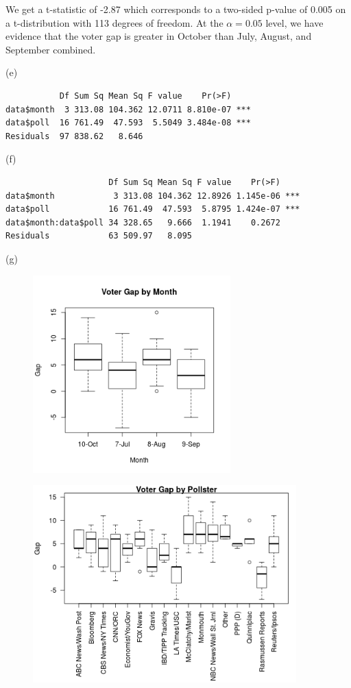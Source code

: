\documentclass[11pt]{article}
\begin{document}
We get a t-statistic of -2.87 which corresponds to a two-sided p-value of 0.005 on a t-distribution with 113 degrees of freedom.  At the $\alpha = 0.05$ level, we have evidence that the voter gap is greater in October than July, August, and September combined.

\vspace{0.1in}

\noindent (e)

\begin{verbatim}
           Df Sum Sq Mean Sq F value    Pr(>F)
data$month  3 313.08 104.362 12.0711 8.810e-07 ***
data$poll  16 761.49  47.593  5.5049 3.484e-08 ***
Residuals  97 838.62   8.646
\end{verbatim}

\vspace{0.1in}

\noindent (f)

\begin{verbatim}
                     Df Sum Sq Mean Sq F value    Pr(>F)
data$month            3 313.08 104.362 12.8926 1.145e-06 ***
data$poll            16 761.49  47.593  5.8795 1.424e-07 ***
data$month:data$poll 34 328.65   9.666  1.1941    0.2672
Residuals            63 509.97   8.095
\end{verbatim}

\pagebreak

\noindent (g)

\begin{figure}[h!]
\includegraphics[width=3in]{boxplotmonth.png}
\end{figure}

\begin{figure}[h!]
\includegraphics[width=4in]{boxplotpoll.png}
\end{figure}
\end{document}
